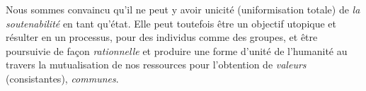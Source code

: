 Nous sommes convaincu qu'il ne peut y avoir unicité (uniformisation totale) de \emph{la soutenabilité} en tant qu'état.
Elle peut toutefois être un objectif utopique et résulter en un processus, pour des individus comme des groupes, et être poursuivie de façon \emph{rationnelle} et produire une forme d'unité de l'humanité au travers la mutualisation de nos ressources pour l'obtention de \emph{valeurs} (consistantes), \emph{communes}.

